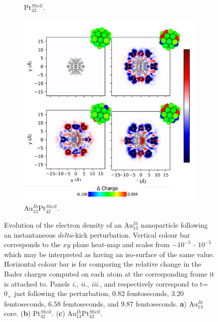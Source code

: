 \begin{figure}
\begin{subfigure}{0.45\textwidth}
        \caption{Pt$_{42}^{Shell}$.}
        \label{fig:CS_Dense}
    \end{subfigure}
    \begin{subfigure}{0.45\textwidth}
    \includegraphics[width=\textwidth]{figures/LM/Atomistic/Alloy_Dense.pdf}
    \caption{Au$_{13}^{Ih}$Pt$_{42}^{Shell}$.}
    \label{fig:CS_TD}
\end{subfigure}
    \caption{Evolution of the electron density of an Au$_{13}^{Ih}$ nanoparticle following an instantaneous $delta$-kick perturbation. Vertical colour bar corresponds to the $xy$ plane heat-map and scales from $-10^{-5}$ - $10^{-5}$ which may be interpreted as having an iso-surface of the same value. Horizontal colour bar is for comparing the relative change in the Bader charges computed on each atom at the corresponding frame it is attached to. Panels \textit{i.}, \textit{ii.}, \textit{iii.}, and  respectively correspond to t=$0_{+}$ just following the perturbation, 0.82 femtoseconds, 3.20 femtoseconds, 6.58 femtoseconds, and 9.87 femtoseconds. \textbf{a}) Au$_{13}^{Ih}$ core. (\textbf{b}) Pt$_{42}^{Shell}$. (\textbf{c}) Au$_{13}^{Ih}$Pt$_{42}^{Shell}$.}
    \label{fig:DFT_CS_Dense}
\end{figure}

